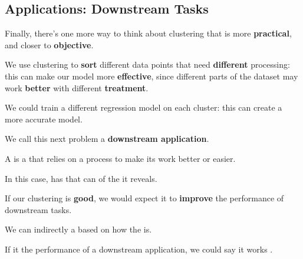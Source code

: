     \subsection*{Applications: Downstream Tasks}
    
        Finally, there's one more way to think about clustering that is more \textbf{practical}, and closer to \textbf{objective}.
        
        We use clustering to \textbf{sort} different data points that need \textbf{different} processing: this can make our model more \textbf{effective}, since different parts of the dataset may work \textbf{better} with different \textbf{treatment}.
        
        \miniex We could train a different regression model on each cluster: this can create a more accurate model.
        
        We call this next problem a \textbf{downstream application}.\\
        
        \begin{definition}
            A  is a  that relies on a  process to make its work better or easier.
            
            In this case,  has  that can  of the  it reveals.
        \end{definition}
        
        If our clustering is \textbf{good}, we would expect it to \textbf{improve} the performance of downstream tasks.\\
        
        \begin{concept}
            We can indirectly  a  based on how  the  is.
            
            If it  the performance of a downstream application, we could say it works .
        \end{concept}